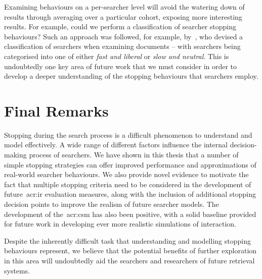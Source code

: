 Examining behaviours on a per-searcher level will avoid the watering down of results through averaging over a particular cohort, exposing more interesting results. For example, could we perform a classification of searcher stopping behaviours? Such an approach was followed, for example, by~\cite{smucker2011user_strategies}, who devised a classification of searchers when examining documents -- with searchers being categorised into one of either \emph{fast and liberal} or \emph{slow and neutral}. This is undoubtedly one key area of future work that we must consider in order to develop a deeper understanding of the stopping behaviours that searchers employ.

\section{Final Remarks}\label{sec:conclusions:remarks}
Stopping during the search process is a difficult phenomenon to understand and model effectively. A wide range of different factors influence the internal decision-making process of searchers. We have shown in this thesis that a number of simple stopping strategies can offer improved performance and approximations of real-world searcher behaviours. We also provide novel evidence to motivate the fact that multiple stopping criteria need to be considered in the development of future~\gls{acr:ir} evaluation measures, along with the inclusion of additional stopping decision points to improve the realism of future searcher models. The development of the~\gls{acr:csm} has also been positive, with a solid baseline provided for future work in developing ever more realistic simulations of interaction.

Despite the inherently difficult task that understanding and modelling stopping behaviours represent, we believe that the potential benefits of further exploration in this area will undoubtedly aid the searchers and researchers of future retrieval systems.


\newpage
\thispagestyle{empty}
\mbox{}
